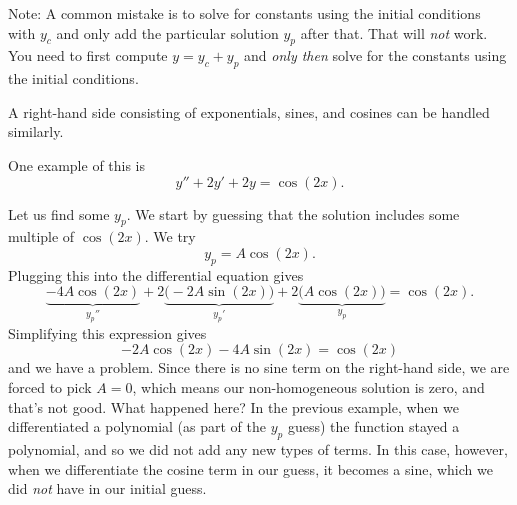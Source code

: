 \documentclass{ximera}
\begin{document}
Note: A common mistake is to solve for constants using the initial conditions with $y_c$ and only add the particular solution $y_p$ after that. That will \emph{not} work.  You need to first compute $y = y_c + y_p$ and \emph{only then} solve for the constants using the initial conditions.

A right-hand side consisting of exponentials, sines, and cosines can be handled similarly.  

\begin{example} 
    One example of this is 
    \begin{equation*}
        y''+2y'+2y = \cos (2x) .
    \end{equation*}
\end{example}
\begin{exampleSol}
    Let us find some $y_p$.  We start by guessing that the solution includes some multiple of $\cos(2x)$. We try
    \begin{equation*}
        y_p = A \cos(2x) .
    \end{equation*}
    Plugging this into the differential equation gives
    \begin{equation*}
        \underbrace{-4 A \cos (2x)}_{y_p''} +2 \underbrace{\bigl(-2A \sin (2x)\bigr)}_{y_p'} + 2 \underbrace{\bigl(A \cos (2x)\bigr)}_{y_p} = \cos (2x).
    \end{equation*}
    Simplifying this expression gives
    \begin{equation*}
        -2A\cos(2x) - 4A\sin(2x) = \cos(2x)
    \end{equation*}
    and we have a problem. Since there is no sine term on the right-hand side, we are forced to pick $A = 0$, which means our non-homogeneous solution is zero, and that's not good. What happened here? In the previous example, when we differentiated a polynomial (as part of the $y_p$ guess) the function stayed a polynomial, and so we did not add any new types of terms. In this case, however, when we differentiate the cosine term in our guess, it becomes a sine, which we did \emph{not} have in our initial guess. 
    

\end{exampleSol}
\end{document}
